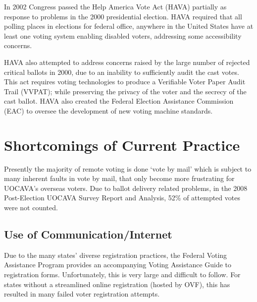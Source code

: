 In 2002 Congress passed the Help America Vote Act (HAVA) partially as response to problems in the 2000 presidential election. HAVA required that all polling places in elections for federal office, anywhere in the United States have at least one voting system enabling disabled voters, addressing some accessibility concerns.

HAVA also attempted to address concerns raised by the large number of rejected critical ballots in 2000, due to an inability to sufficiently audit the cast votes. This act requires voting technologies to produce a Verifiable Voter Paper Audit Trail (VVPAT); while preserving the privacy of the voter and the secrecy of the cast ballot. HAVA also created the Federal Election Assistance Commission (EAC) to oversee the development of new voting machine standards.




\section{Shortcomings of Current Practice}

Presently the majority of remote voting is done `vote by mail'  which is subject to many inherent faults in vote by mail, that only become more frustrating for UOCAVA's overseas voters. Due to ballot delivery related problems, in the 2008 Post-Election UOCAVA Survey Report and Analysis, 52\% of attempted votes were not counted. %


\subsection{Use of Communication/Internet}
Due to the many states' diverse registration practices, the Federal Voting Assistance Program provides an accompanying Voting Assistance Guide to registration forms. Unfortunately, this is very large and difficult to follow. For states without a streamlined online registration (hosted by OVF), this has resulted in many failed voter registration attempts.

